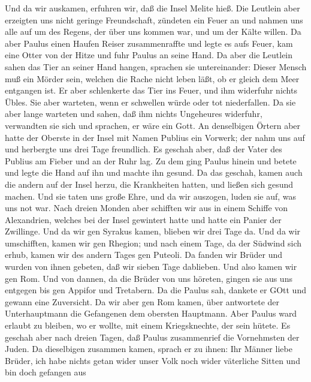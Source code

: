  Und da wir auskamen, erfuhren wir, daß die Insel Melite
hieß.  Die Leutlein aber erzeigten uns nicht geringe
Freundschaft, zündeten ein Feuer an und nahmen uns alle auf um des
Regens, der über uns kommen war, und um der Kälte willen. 
Da aber Paulus einen Haufen Reiser zusammenraffte und legte es aufs
Feuer, kam eine Otter von der Hitze und fuhr Paulus an seine Hand.
 Da aber die Leutlein sahen das Tier an seiner Hand hangen,
sprachen sie untereinander: Dieser Mensch muß ein Mörder sein, welchen
die Rache nicht leben läßt, ob er gleich dem Meer entgangen ist.
 Er aber schlenkerte das Tier ins Feuer, und ihm widerfuhr
nichts Übles.  Sie aber warteten, wenn er schwellen würde
oder tot niederfallen. Da sie aber lange warteten und sahen, daß ihm
nichts Ungeheures widerfuhr, verwandten sie sich und sprachen, er wäre
ein Gott.  An denselbigen Örtern aber hatte der Oberste in
der Insel mit Namen Publius ein Vorwerk; der nahm uns auf und herbergte
uns drei Tage freundlich.  Es geschah aber, daß der Vater
des Publius am Fieber und an der Ruhr lag. Zu dem ging Paulus hinein und
betete und legte die Hand auf ihn und machte ihn gesund.  Da
das geschah, kamen auch die andern auf der Insel herzu, die Krankheiten
hatten, und ließen sich gesund machen.  Und sie taten uns
große Ehre, und da wir auszogen, luden sie auf, was uns not war.
 Nach dreien Monden aber schifften wir aus in einem Schiffe
von Alexandrien, welches bei der Insel gewintert hatte und hatte ein
Panier der Zwillinge.  Und da wir gen Syrakus kamen,
blieben wir drei Tage da.  Und da wir umschifften, kamen
wir gen Rhegion; und nach einem Tage, da der Südwind sich erhub, kamen
wir des andern Tages gen Puteoli.  Da fanden wir Brüder und
wurden von ihnen gebeten, daß wir sieben Tage dablieben. Und also kamen
wir gen Rom.  Und von dannen, da die Brüder von uns
höreten, gingen sie aus uns entgegen bis gen Appifor und Tretabern. Da
die Paulus sah, dankete er GOtt und gewann eine Zuversicht.
 Da wir aber gen Rom kamen, über antwortete der
Unterhauptmann die Gefangenen dem obersten Hauptmann. Aber Paulus ward
erlaubt zu bleiben, wo er wollte, mit einem Kriegsknechte, der sein
hütete.  Es geschah aber nach dreien Tagen, daß Paulus
zusammenrief die Vornehmsten der Juden. Da dieselbigen zusammen kamen,
sprach er zu ihnen: Ihr Männer liebe Brüder, ich habe nichts getan wider
unser Volk noch wider väterliche Sitten und bin doch gefangen aus
